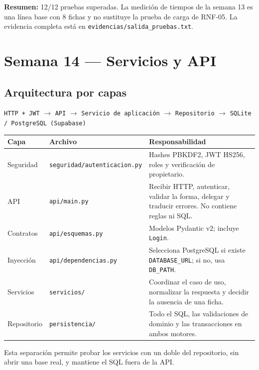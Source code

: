 \documentclass[11pt,a4paper]{article}
\newcommand{\code}[1]{\texttt{#1}}
\newcommand{\thead}[1]{\textbf{#1}}
\begin{document}
\textbf{Resumen:} 12/12 pruebas superadas. La medición de tiempos de la semana
13 es una línea base con 8 fichas y no sustituye la prueba de carga de RNF-05.
La evidencia completa está en \code{evidencias/salida\_pruebas.txt}.

\clearpage

\section{Semana 14 --- Servicios y API}

\subsection{Arquitectura por capas}

\begin{center}
\code{HTTP + JWT} $\rightarrow$ \code{API} $\rightarrow$
\code{Servicio de aplicación} $\rightarrow$ \code{Repositorio} $\rightarrow$
\code{SQLite / PostgreSQL (Supabase)}
\end{center}

{\footnotesize
\begin{tabularx}{\linewidth}{@{}V{0.55}V{1.05}V{1.4}@{}}
\toprule
\thead{Capa} & \thead{Archivo} & \thead{Responsabilidad} \\ \midrule
Seguridad & \code{seguridad/autenticacion.py} & Hashes PBKDF2, JWT HS256, roles
y verificación de propietario. \\
API & \code{api/main.py} & Recibir HTTP, autenticar, validar la forma, delegar y
traducir errores. No contiene reglas ni SQL. \\
Contratos & \code{api/esquemas.py} & Modelos Pydantic v2; incluye \code{Login}. \\
Inyección & \code{api/dependencias.py} & Selecciona PostgreSQL si existe
\code{DATABASE\_URL}; si no, usa \code{DB\_PATH}. \\
Servicios & \code{servicios/} & Coordinar el caso de uso, normalizar la
respuesta y decidir la ausencia de una ficha. \\
Repositorio & \code{persistencia/} & Todo el SQL, las validaciones de dominio y
las transacciones en ambos motores. \\
\bottomrule
\end{tabularx}
}

Esta separación permite probar los servicios con un doble del repositorio, sin
abrir una base real, y mantiene el SQL fuera de la API.
\end{document}
